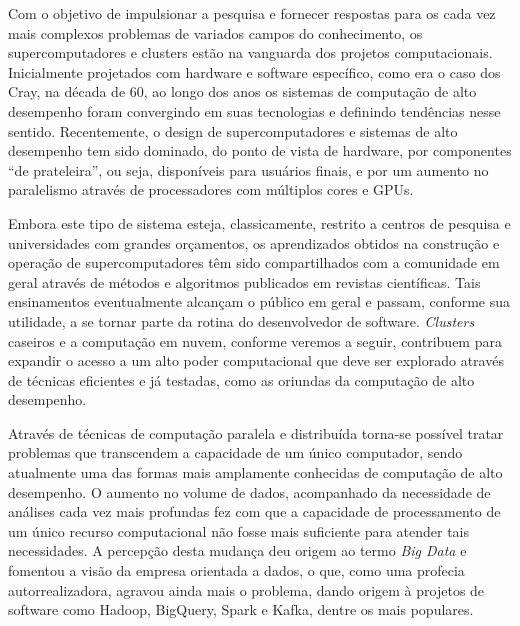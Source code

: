\documentclass[english,brazilian]{UNISINOSmonografia} %
\begin{document}


Com o objetivo de impulsionar a pesquisa e fornecer respostas para os cada vez mais complexos problemas de variados campos do conhecimento, os supercomputadores e clusters estão na vanguarda dos projetos computacionais.
Inicialmente projetados com hardware e software específico, como era o caso dos Cray, na década de 60, ao longo dos anos os sistemas de computação de alto desempenho foram convergindo em suas tecnologias e definindo tendências nesse sentido.
Recentemente, o design de supercomputadores e sistemas de alto desempenho tem sido dominado, do ponto de vista de hardware, por componentes ``de prateleira'', ou seja, disponíveis para usuários finais, e por um aumento no paralelismo através de processadores com múltiplos cores e GPUs.


Embora este tipo de sistema esteja, classicamente, restrito a centros de pesquisa e universidades com grandes orçamentos, os aprendizados obtidos na construção e operação de supercomputadores têm sido compartilhados com a comunidade em geral através de métodos e algoritmos publicados em revistas científicas.
Tais ensinamentos eventualmente alcançam o público em geral e passam, conforme sua utilidade, a se tornar parte da rotina do desenvolvedor de software.
\textit{Clusters} caseiros e a computação em nuvem, conforme veremos a seguir, contribuem para expandir o acesso a um alto poder computacional que deve ser explorado através de técnicas eficientes e já testadas, como as oriundas da computação de alto desempenho.


Através de técnicas de computação paralela e distribuída torna-se possível tratar problemas que transcendem a capacidade de um único computador, sendo atualmente uma das formas mais amplamente conhecidas de computação de alto desempenho.
O aumento no volume de dados, acompanhado da necessidade de análises cada vez mais profundas fez com que a capacidade de processamento de um único recurso computacional não fosse mais suficiente para atender tais necessidades.
A percepção desta mudança deu origem ao termo \textit{Big Data} e fomentou a visão da empresa orientada a dados, o que, como uma profecia autorrealizadora, agravou ainda mais o problema, dando origem à projetos de software como Hadoop, BigQuery, Spark e Kafka, dentre os mais populares.
\end{document}
